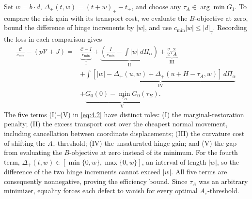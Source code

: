 Set \(w=b\cdot d\), \(\Delta_+(t,w)=(t+w)_+-t_+\), and choose any \(\tau_A\in\arg\min G_1\). To compare the risk gain with its transport cost, we evaluate the \(B\)-objective at zero, bound the difference of hinge increments by \(|w|\), and use \(c_{\min}|w|\le |d|_\gamma\). Recording the loss in each comparison gives
\begin{equation}
\begin{aligned}
\frac{\mathcal C}{c_{\min}}-(p\mathcal V+J)
={}&\underbrace{\frac{\mathcal C-I}{c_{\min}}}_{\mathrm{I}}
+\underbrace{\left(\frac I {c_{\min}}-\int |w|\,d\Pi_\alpha\right)}_{\mathrm{II}}
+\underbrace{\frac g2\tau_A^2}_{\mathrm{III}}\\
&+\underbrace{\int[|w|-\Delta_+(u,w)+\Delta_+(u+H-\tau_A,w)]\,d\Pi_\alpha}_{\mathrm{IV}}\\
&+\underbrace{G_0(0)-\min_{\tau_B}G_0(\tau_B)}_{\mathrm{V}}.
\end{aligned}
\tag{4.2}\label{eq:4.2}
\end{equation}
The five terms (I)--(V) in \eqref{eq:4.2} have distinct roles: (I) the marginal-restoration penalty; (II) the excess transport cost over the cheapest normal movement, including cancellation between coordinate displacements; (III) the curvature cost of shifting the \(A_\varepsilon\)-threshold; (IV) the unsaturated hinge gain; and (V) the gap from evaluating the \(B\)-objective at zero instead of its minimum. For the fourth term, \(\Delta_+(t,w)\in[\min\{0,w\},\max\{0,w\}]\), an interval of length \(|w|\), so the difference of the two hinge increments cannot exceed \(|w|\). All five terms are consequently nonnegative, proving the efficiency bound. Since \(\tau_A\) was an arbitrary minimizer, equality forces each defect to vanish for every optimal \(A_\varepsilon\)-threshold.
